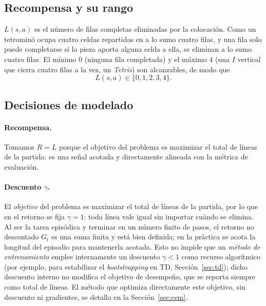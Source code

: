 \subsection{Recompensa y su rango}
\label{subsec:recompensa}
$L(s, a)$ es el número de filas completas eliminadas por la colocación. Como un
tetrominó ocupa cuatro celdas repartidas en a lo sumo cuatro filas, y una fila
solo puede completarse si la pieza aporta alguna celda a ella, se eliminan a lo
sumo cuatro filas. El mínimo $0$ (ninguna fila completada) y el máximo $4$ (una
$I$ vertical que cierra cuatro filas a la vez, un \emph{Tetris}) son alcanzables,
de modo que
\[
    L(s, a) \in \{0, 1, 2, 3, 4\}.
\]

\subsection{Decisiones de modelado}
\label{subsec:decisiones}
\paragraph{Recompensa.} Tomamos $R = L$ porque el objetivo del problema es
maximizar el total de líneas de la partida: es una señal acotada y directamente
alineada con la métrica de evaluación.

\paragraph{Descuento $\gamma$.} El \emph{objetivo} del problema es maximizar el
total de líneas de la partida, por lo que en el retorno se fija $\gamma = 1$: toda
línea vale igual sin importar cuándo se elimina. Al ser la tarea episódica y
terminar en un número finito de pasos, el retorno no descontado $G_t$ es una suma
finita y está bien definida; en la práctica se acota la longitud del episodio para
mantenerla acotada. Esto no impide que un \emph{método de entrenamiento} emplee
internamente un descuento $\gamma < 1$ como recurso algorítmico (por ejemplo, para
estabilizar el \emph{bootstrapping} en TD, Sección~\ref{sec:td}); dicho descuento
interno no modifica el objetivo de desempeño, que se reporta siempre como total de
líneas. El método que optimiza directamente este objetivo, sin descuento ni
gradientes, se detalla en la Sección~\ref{sec:cem}.

